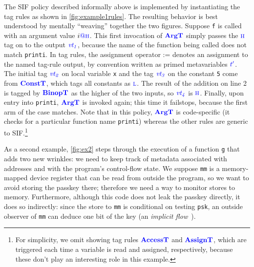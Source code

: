 \documentclass{llncs}
\begin{document}
The SIF policy described informally above is implemented by instantiating the
tag rules as shown in \cref{fig:example1rules}.  The resulting behavior is best understood
by mentally ``weaving'' together the two figures.
Suppose {\tt f} is called with an argument value \(i \tagat \high\).
This first invocation of \(\argtname\) simply passes the \(\high\) tag on to the output \(\vt[_1]\),
because the name of the function being called does not match {\tt printi}. 
In tag rules, the assignment operator := denotes an assignment to the named tag-rule output, by convention
written as primed metavariables \(\gentag[']\).
The initial tag \(\vt[_2]\) on local variable {\tt x} and the tag \(\vt[_3]\) on the constant {\tt 5}
come from \(\consttname\), which tags all constants as \(\low\).
The result of the addition on line 2 is tagged by \(\binoptname\) as the
higher of the two inputs, so \(\vt[_4]\) is \(\high\). Finally, upon entry into {\tt printi}, \(\argtname\)
is invoked again; this time it failstops, because the first arm of the case matches.
Note that in this policy, \(\argtname\) is code-specific (it checks for a particular function name {\tt printi})
whereas the other rules are generic to SIF.\footnote{
For simplicity, we omit showing tag rules \(\accesstname\) and \(\assigntname\), 
which are triggered each time a variable is read and assigned, respectively, because these
don't play an interesting role in this example.}

As a second example, \cref{fig:ex2} steps through the execution of a function {\tt g} that adds two new wrinkles:
we need to keep track of metadata associated with
addresses and with the program's control-flow state. We suppose {\tt mm} is
a memory-mapped device register that can be read from outside the program, so we want to avoid storing the passkey there;
therefore we need a way to monitor stores to memory.  Furthermore, although this code does not leak the passkey directly,
it does so indirectly: since the store to {\tt mm} is conditional on testing {\tt psk},
an outside observer of {\tt mm} can deduce one bit of the key (an {\em implicit flow}~\cite{Denning76:SFIlattice}).
\end{document}
